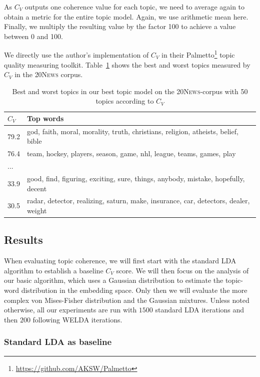 \documentclass[
        a4paper,
        titlepage,
        twoside,
        parskip
        ]{scrbook}
\newcommand{\ra}[1]{\renewcommand{\arraystretch}{#1}}
\theoremstyle{break}
\begin{document}
As $C_V$ outputs one coherence value for each topic, we need to average again to obtain a metric for the entire topic model.
Again, we use arithmetic mean here.
Finally, we multiply the resulting value by the factor 100 to achieve a value between 0 and 100.

We directly use the author's implementation of $C_V$ in their Palmetto\footnote{\url{https://github.com/AKSW/Palmetto}} topic quality measuring toolkit.
Table~\ref{table:best_worst_cv_topics} shows the best and worst topics measured by $C_V$ in the \textsc{20News} corpus.
\begin{table}[]
  \ra{1.15}
  \centering
  \caption{Best and worst topics in our best topic model on the \textsc{20News}-corpus with 50 topics according to $C_V$}
  \begin{tabular}{ll}
  \toprule
  $C_V$ & Top words \\ \midrule
  79.2               & god, faith, moral, morality, truth, christians, religion, atheists, belief, bible \\
  76.4               & team, hockey, players, season, game, nhl, league, teams, games, play \\
  ...                &                    \\
  33.9               & good, find, figuring, exciting, sure, things, anybody, mistake, hopefully, decent \\
  30.5               & radar, detector, realizing, saturn, make, insurance, car, detectors, dealer, weight \\ \bottomrule
  \end{tabular}
  \label{table:best_worst_cv_topics}
\end{table}

\subsection{Results}

When evaluating topic coherence, we will first start with the standard LDA algorithm to establish a baseline $C_V$ score.
We will then focus on the analysis of our basic algorithm, which uses a Gaussian distribution to estimate the topic-word distribution in the embedding space.
Only then we will evaluate the more complex von Mises-Fisher distribution and the Gaussian mixtures.
Unless noted otherwise, all our experiments are run with $1500$ standard LDA iterations and then $200$ following WELDA iterations.

\subsubsection{Standard LDA as baseline}
\label{sec:lda_as_baseline}
\end{document}
